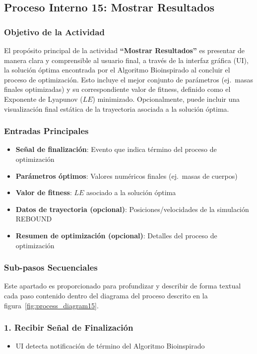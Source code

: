 \subsection{Proceso Interno 15: Mostrar Resultados}

\subsubsection{Objetivo de la Actividad}
El propósito principal de la actividad \textbf{``Mostrar Resultados''} es presentar de manera clara y comprensible al usuario final, a través de la interfaz gráfica (UI), la solución óptima encontrada por el Algoritmo Bioinspirado al concluir el proceso de optimización. Esto incluye el mejor conjunto de parámetros (ej.\ masas finales optimizadas) y su correspondiente valor de fitness, definido como el Exponente de Lyapunov ($LE$) minimizado. Opcionalmente, puede incluir una visualización final estática de la trayectoria asociada a la solución óptima.

\subsubsection{Entradas Principales}
\begin{itemize}
    \item \textbf{Señal de finalización}: Evento que indica término del proceso de optimización
    \item \textbf{Parámetros óptimos}: Valores numéricos finales (ej.\ masas de cuerpos)
    \item \textbf{Valor de fitness}: $LE$ asociado a la solución óptima
    \item \textbf{Datos de trayectoria (opcional)}: Posiciones/velocidades de la simulación REBOUND
    \item \textbf{Resumen de optimización (opcional)}: Detalles del proceso de optimización
\end{itemize}

\subsubsection{Sub-pasos Secuenciales}
Este apartado es proporcionado para profundizar y describir de forma textual cada paso contenido dentro del diagrama del proceso descrito en la figura~\ref{fig:process_diagram15}.
\subsubsection*{1. Recibir Señal de Finalización}
\begin{itemize}
    \item UI detecta notificación de término del Algoritmo Bioinspirado
\end{itemize}

